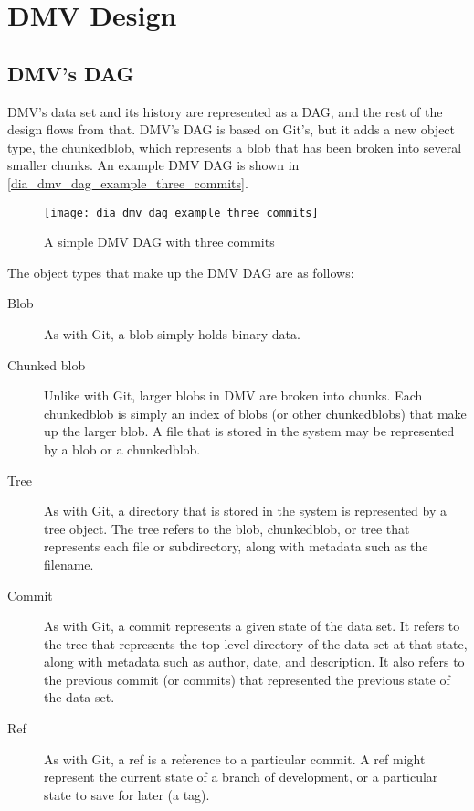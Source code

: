 \chapter{DMV Design}


\section{DMV's DAG}

\gls{DMV}'s data set and its history are represented as a \gls{DAG}, and the
rest of the design flows from that. \gls{DMV}'s \gls{DAG} is based on Git's, but
it adds a new object type, the \gls{chunkedblob}, which represents a \gls{blob}
that has been broken into several smaller chunks. An example \gls{DMV} \gls{DAG}
is shown in \autoref{dia_dmv_dag_example_three_commits}.

\begin{figure}[]
    \centering
    \texttt{[image: dia\_dmv\_dag\_example\_three\_commits]}
    \caption{A simple DMV DAG with three commits}
    \label{dia_dmv_dag_example_three_commits}
\end{figure}

The object types that make up the \gls{DMV} \gls{DAG} are as follows:

\begin{description}

    \item[Blob] As with Git, a \gls{blob} simply holds binary data.

    \item[Chunked blob] Unlike with Git, larger \glspl{blob} in \gls{DMV} are
        broken into chunks. Each \gls{chunkedblob} is simply an index of
        \glspl{blob} (or other \glspl{chunkedblob}) that make up the larger
        \gls{blob}. A file that is stored in the system may be represented by a
        \gls{blob} or a \gls{chunkedblob}.

    \item[Tree] As with Git, a directory that is stored in the system is
        represented by a \gls{tree} object. The \gls{tree} refers to the
        \gls{blob}, \gls{chunkedblob}, or \gls{tree} that represents each file
        or subdirectory, along with metadata such as the filename.

    \item[Commit] As with Git, a \gls{commit} represents a given state of the
        data set. It refers to the \gls{tree} that represents the top-level
        directory of the data set at that state, along with metadata such as
        author, date, and description. It also refers to the previous
        \gls{commit} (or \glspl{commit}) that represented the previous state of
        the data set.

    \item[Ref] As with Git, a \gls{ref} is a reference to a particular
        \gls{commit}. A \gls{ref} might represent the current state of a branch of
        development, or a particular state to save for later (a tag).

\end{description}

